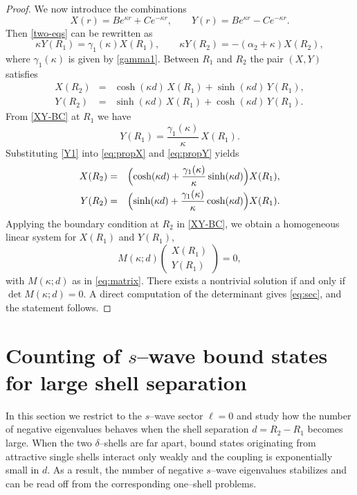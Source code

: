\documentclass[a4paper,11pt]{article}
\numberwithin{equation}{section}
\theoremstyle{definition}
\theoremstyle{remark}
\begin{document}
\begin{proof}
We now introduce the combinations
\begin{equation}\label{XY-def}
X(r)=B e^{\kappa r}+C e^{-\kappa r},\qquad
Y(r)=B e^{\kappa r}-C e^{-\kappa r}.
\end{equation}
Then \eqref{two-eqs} can be rewritten as
\begin{equation}\label{XY-BC}
\kappa Y(R_1)=\gamma_1(\kappa) X(R_1),\qquad
\kappa Y(R_2)=-(\alpha_2+\kappa)X(R_2),
\end{equation}
where $\gamma_1(\kappa)$ is given by \eqref{gamma1}.
Between $R_1$ and $R_2$ the pair $(X,Y)$ satisfies
\begin{eqnarray}
X(R_2)&=&\cosh(\kappa d)\,X(R_1)+\sinh(\kappa d)\,Y(R_1), \label{eq:propX}\\
Y(R_2)&=&\sinh(\kappa d)\,X(R_1)+\cosh(\kappa d)\,Y(R_1). \label{eq:propY}
\end{eqnarray}
From \eqref{XY-BC} at $R_1$ we have
\begin{equation}\label{Y1}
Y(R_1)=\frac{\gamma_1(\kappa)}{\kappa}\,X(R_1).
\end{equation}
Substituting \eqref{Y1} into \eqref{eq:propX} and \eqref{eq:propY} yields
\begin{eqnarray}\label{prop2}
X(R_2)&=&\Bigl(\cosh(\kappa d)+\frac{\gamma_1(\kappa)}{\kappa}\sinh(\kappa d)\Bigr)X(R_1),\\
Y(R_2)&=&\Bigl(\sinh(\kappa d)+\frac{\gamma_1(\kappa)}{\kappa}\cosh(\kappa d)\Bigr)X(R_1).
\end{eqnarray}
Applying the boundary condition at $R_2$ in \eqref{XY-BC}, we obtain a homogeneous
linear system for $X(R_1)$ and $Y(R_1)$,
$$
M(\kappa;d)
\left(
\begin{array}{c}
X(R_1)\\[2pt]
Y(R_1)
\end{array}
\right)
=0,
$$
with $M(\kappa;d)$ as in \eqref{eq:matrix}.
There exists a nontrivial solution if and only if $\det M(\kappa;d)=0$.
A direct computation of the determinant gives \eqref{eq:sec}, and the statement follows.
\end{proof}





\section{Counting of $s$--wave bound states for large shell separation}\label{sec:counting}

In this section we restrict to the $s$--wave sector $\ell=0$ and study how the
number of negative eigenvalues behaves when the shell separation
$d=R_2-R_1$ becomes large.
When the two $\delta$--shells are far apart, bound states originating from
attractive single shells interact only weakly and the coupling is exponentially
small in $d$.
As a result, the number of negative $s$--wave eigenvalues stabilizes and can be
read off from the corresponding one--shell problems.
\end{document}
